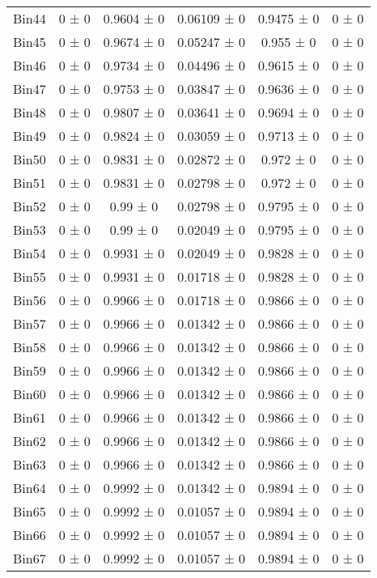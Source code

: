 \begin{tabular}{@{\extracolsep{4pt}}lccccc@{}}
     Bin44 & 0 ± 0 & 0.9604 ± 0 & 0.06109 ± 0 & 0.9475 ± 0 & 0 ± 0 \\ 
     Bin45 & 0 ± 0 & 0.9674 ± 0 & 0.05247 ± 0 & 0.955 ± 0 & 0 ± 0 \\ 
     Bin46 & 0 ± 0 & 0.9734 ± 0 & 0.04496 ± 0 & 0.9615 ± 0 & 0 ± 0 \\ 
     Bin47 & 0 ± 0 & 0.9753 ± 0 & 0.03847 ± 0 & 0.9636 ± 0 & 0 ± 0 \\ 
     Bin48 & 0 ± 0 & 0.9807 ± 0 & 0.03641 ± 0 & 0.9694 ± 0 & 0 ± 0 \\ 
     Bin49 & 0 ± 0 & 0.9824 ± 0 & 0.03059 ± 0 & 0.9713 ± 0 & 0 ± 0 \\ 
     Bin50 & 0 ± 0 & 0.9831 ± 0 & 0.02872 ± 0 & 0.972 ± 0 & 0 ± 0 \\ 
     Bin51 & 0 ± 0 & 0.9831 ± 0 & 0.02798 ± 0 & 0.972 ± 0 & 0 ± 0 \\ 
     Bin52 & 0 ± 0 & 0.99 ± 0 & 0.02798 ± 0 & 0.9795 ± 0 & 0 ± 0 \\ 
     Bin53 & 0 ± 0 & 0.99 ± 0 & 0.02049 ± 0 & 0.9795 ± 0 & 0 ± 0 \\ 
     Bin54 & 0 ± 0 & 0.9931 ± 0 & 0.02049 ± 0 & 0.9828 ± 0 & 0 ± 0 \\ 
     Bin55 & 0 ± 0 & 0.9931 ± 0 & 0.01718 ± 0 & 0.9828 ± 0 & 0 ± 0 \\ 
     Bin56 & 0 ± 0 & 0.9966 ± 0 & 0.01718 ± 0 & 0.9866 ± 0 & 0 ± 0 \\ 
     Bin57 & 0 ± 0 & 0.9966 ± 0 & 0.01342 ± 0 & 0.9866 ± 0 & 0 ± 0 \\ 
     Bin58 & 0 ± 0 & 0.9966 ± 0 & 0.01342 ± 0 & 0.9866 ± 0 & 0 ± 0 \\ 
     Bin59 & 0 ± 0 & 0.9966 ± 0 & 0.01342 ± 0 & 0.9866 ± 0 & 0 ± 0 \\ 
     Bin60 & 0 ± 0 & 0.9966 ± 0 & 0.01342 ± 0 & 0.9866 ± 0 & 0 ± 0 \\ 
     Bin61 & 0 ± 0 & 0.9966 ± 0 & 0.01342 ± 0 & 0.9866 ± 0 & 0 ± 0 \\ 
     Bin62 & 0 ± 0 & 0.9966 ± 0 & 0.01342 ± 0 & 0.9866 ± 0 & 0 ± 0 \\ 
     Bin63 & 0 ± 0 & 0.9966 ± 0 & 0.01342 ± 0 & 0.9866 ± 0 & 0 ± 0 \\ 
     Bin64 & 0 ± 0 & 0.9992 ± 0 & 0.01342 ± 0 & 0.9894 ± 0 & 0 ± 0 \\ 
     Bin65 & 0 ± 0 & 0.9992 ± 0 & 0.01057 ± 0 & 0.9894 ± 0 & 0 ± 0 \\ 
     Bin66 & 0 ± 0 & 0.9992 ± 0 & 0.01057 ± 0 & 0.9894 ± 0 & 0 ± 0 \\ 
     Bin67 & 0 ± 0 & 0.9992 ± 0 & 0.01057 ± 0 & 0.9894 ± 0 & 0 ± 0 \\ 

\end{tabular}
